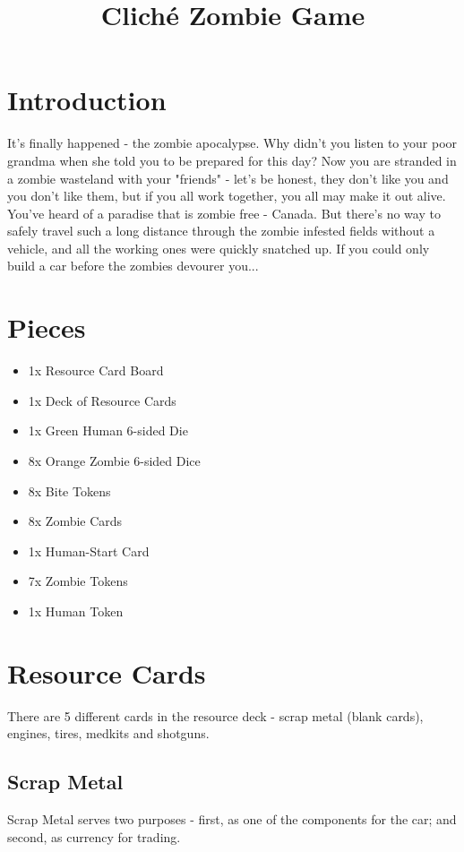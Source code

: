 \documentclass[12pt]{article} %
\date{}
\begin{document}
\title{Clich\'{e} Zombie Game}
\maketitle

\section{Introduction}

It's finally happened - the zombie apocalypse.  Why didn't you listen to your poor grandma when she told you to be prepared for this day?  Now you are stranded in a zombie wasteland with your "friends" - let's be honest, they don't like you and you don't like them, but if you all work together, you all may make it out alive.  You've heard of a paradise that is zombie free - Canada.  But there's no way to safely travel such a long distance through the zombie infested fields without a vehicle, and all the working ones were quickly snatched up.  If you could only build a car before the zombies devourer you...

\section{Pieces}

\begin{itemize}
	\item 1x Resource Card Board
	\item 1x Deck of Resource Cards
	\item 1x Green Human 6-sided Die
	\item 8x Orange Zombie 6-sided Dice
	\item 8x Bite Tokens
	\item 8x Zombie Cards
	\item 1x Human-Start Card
	\item 7x Zombie Tokens
	\item 1x Human Token
\end{itemize}

\section{Resource Cards}
There are 5 different cards in the resource deck - scrap metal (blank cards), engines, tires, medkits and shotguns.  

\subsection{Scrap Metal}
Scrap Metal serves two purposes - first, as one of the components for the car; and second, as currency for trading.
\end{document}
